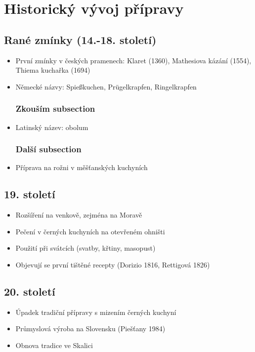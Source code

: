 \documentclass[a5paper,10pt]{book}
\begin{document}
\chapter{Historický vývoj přípravy}
\section{Rané zmínky (14.-18. století)}
\begin{itemize}
\item První zmínky v českých pramenech: Klaret (1360), Mathesiova kázání (1554), Thiema kuchařka (1694)
\item Německé názvy: Spießkuchen, Prügelkrapfen, Ringelkrapfen
\subsection{Zkouším subsection}
\item Latinský název: obolum
\subsection{Další subsection}
\item Příprava na rožni v měšťanských kuchyních
\end{itemize}

\section{19. století}
\begin{itemize}
\item Rozšíření na venkově, zejména na Moravě
\item Pečení v černých kuchyních na otevřeném ohništi
\item Použití při svátcích (svatby, křtiny, masopust)
\item Objevují se první tištěné recepty (Dorizio 1816, Rettigová 1826)
\end{itemize}

\section{20. století}
\begin{itemize}
\item Úpadek tradiční přípravy s mizením černých kuchyní
\item Průmyslová výroba na Slovensku (Piešťany 1984)
\item Obnova tradice ve Skalici
\end{itemize}
\end{document}
